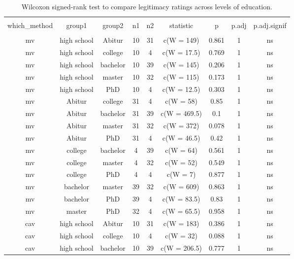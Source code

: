 
\begin{table}[!htbp] \centering 
  \caption{Wilcoxon signed-rank test to compare legitimacy ratings across levels of education.} 
  \label{tab:leg_education} 
\footnotesize 
\begin{tabular}{@{\extracolsep{5pt}} ccccccccc} 
\\[-1.8ex]\hline 
\hline \\[-1.8ex] 
which\_method & group1 & group2 & n1 & n2 & statistic & p & p.adj & p.adj.signif \\ 
\hline \\[-1.8ex] 
mv & high school & Abitur & 10 & 31 & c(W = 149) & 0.861 & 1 & ns \\ 
mv & high school & college & 10 & 4 & c(W = 17.5) & 0.769 & 1 & ns \\ 
mv & high school & bachelor & 10 & 39 & c(W = 145) & 0.206 & 1 & ns \\ 
mv & high school & master & 10 & 32 & c(W = 115) & 0.173 & 1 & ns \\ 
mv & high school & PhD & 10 & 4 & c(W = 12.5) & 0.303 & 1 & ns \\ 
mv & Abitur & college & 31 & 4 & c(W = 58) & 0.85 & 1 & ns \\ 
mv & Abitur & bachelor & 31 & 39 & c(W = 469.5) & 0.1 & 1 & ns \\ 
mv & Abitur & master & 31 & 32 & c(W = 372) & 0.078 & 1 & ns \\ 
mv & Abitur & PhD & 31 & 4 & c(W = 46.5) & 0.42 & 1 & ns \\ 
mv & college & bachelor & 4 & 39 & c(W = 64) & 0.561 & 1 & ns \\ 
mv & college & master & 4 & 32 & c(W = 52) & 0.549 & 1 & ns \\ 
mv & college & PhD & 4 & 4 & c(W = 7) & 0.877 & 1 & ns \\ 
mv & bachelor & master & 39 & 32 & c(W = 609) & 0.863 & 1 & ns \\ 
mv & bachelor & PhD & 39 & 4 & c(W = 83.5) & 0.83 & 1 & ns \\ 
mv & master & PhD & 32 & 4 & c(W = 65.5) & 0.958 & 1 & ns \\ 
cav & high school & Abitur & 10 & 31 & c(W = 183) & 0.386 & 1 & ns \\ 
cav & high school & college & 10 & 4 & c(W = 32) & 0.088 & 1 & ns \\ 
cav & high school & bachelor & 10 & 39 & c(W = 206.5) & 0.777 & 1 & ns \\ 

\end{tabular}
\end{table}

